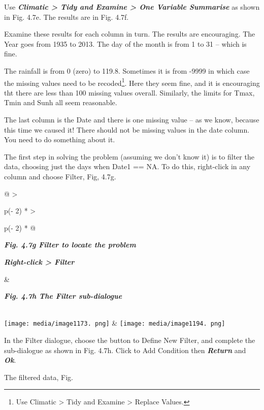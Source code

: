 \documentclass[
  letterpaper,
  DIV=11,
  numbers=noendperiod]{scrreprt}
\begin{document}
Use \textbf{\emph{Climatic \textgreater{} Tidy and Examine
\textgreater{} One Variable Summarise}} as shown in Fig. 4.7e. The
results are in Fig. 4.7f.

Examine these results for each column in turn. The results are
encouraging. The Year goes from 1935 to 2013. The day of the month is
from 1 to 31 -- which is fine.

The rainfall is from 0 (zero) to 119.8. Sometimes it is from -9999 in
which case the missing values need to be recoded\footnote{Use Climatic
  \textgreater{} Tidy and Examine \textgreater{} Replace Values.}. Here
they seem fine, and it is encouraging tht there are less than 100
missing values overall. Similarly, the limits for Tmax, Tmin and Sunh
all seem reasonable.

The last column is the Date and there is one missing value -- as we
know, because this time we caused it! There should not be missing values
in the date column. You need to do something about it.

The first step in solving the problem (assuming we don't know it) is to
filter the data, choosing just the days when Date1 == NA. To do this,
right-click in any column and choose Filter, Fig, 4.7g.

\begin{longtable}[]{@{}
  >{\raggedright\arraybackslash}p{(\columnwidth - 2\tabcolsep) * }
  >{\raggedright\arraybackslash}p{(\columnwidth - 2\tabcolsep) * }@{}}
\toprule\noalign{}
\begin{minipage}[b]{\linewidth}\raggedright
\textbf{\emph{Fig. 4.7g Filter to locate the problem}}

\textbf{\emph{Right-click \textgreater{} Filter}}
\end{minipage} & \begin{minipage}[b]{\linewidth}\raggedright
\textbf{\emph{Fig. 4.7h The Filter sub-dialogue}}
\end{minipage} \\
\midrule\noalign{}
\endhead
\bottomrule\noalign{}
\endlastfoot
\texttt{[image: media/image1173. png]}
&
\texttt{[image: media/image1194. png]} \\
\end{longtable}

In the Filter dialogue, choose the button to Define New Filter, and
complete the sub-dialogue as shown in Fig. 4.7h. Click to Add Condition
then \textbf{\emph{Return}} and \textbf{\emph{Ok}}.

The filtered data, Fig.
\end{document}
